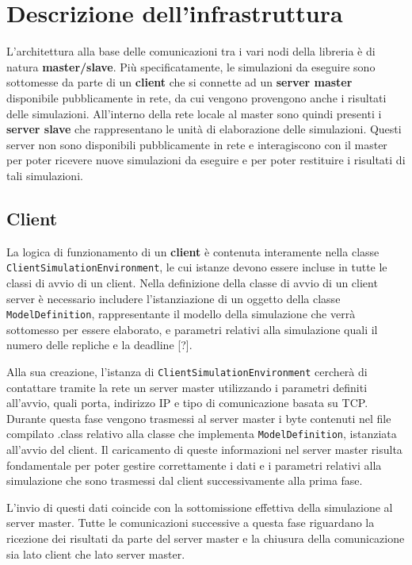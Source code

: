 
\section{Descrizione dell'infrastruttura}
L'architettura alla base delle comunicazioni tra i vari nodi della libreria è di natura \textbf{master/slave}.
Più specificatamente, le simulazioni da eseguire sono sottomesse da parte di un \textbf{client} che si connette ad un \textbf{server master} disponibile pubblicamente in rete, da cui vengono provengono anche i risultati delle simulazioni. 
All'interno della rete locale al master sono quindi presenti i \textbf{server slave} che rappresentano le unità di elaborazione delle simulazioni. Questi server non sono disponibili pubblicamente in rete e interagiscono con il master per poter ricevere nuove simulazioni da eseguire e per poter restituire i risultati di tali simulazioni.

\subsection{Client}
La logica di funzionamento di un \textbf{client} è contenuta interamente nella classe \texttt{ClientSimulationEnvironment}, le cui istanze devono essere incluse in tutte le classi di avvio di un client.
Nella definizione della classe di avvio di un client server è necessario includere l'istanziazione di un oggetto della classe \texttt{ModelDefinition}, rappresentante il modello della simulazione che verrà sottomesso per essere elaborato, e parametri relativi alla simulazione quali il numero delle repliche e la deadline [?].

Alla sua creazione, l'istanza di \texttt{ClientSimulationEnvironment} cercherà di contattare tramite la rete un server master utilizzando i parametri definiti all'avvio, quali porta, indirizzo IP e tipo di comunicazione basata su TCP. 
Durante questa fase vengono trasmessi al server master i byte contenuti nel file compilato .class relativo alla classe che implementa \texttt{ModelDefinition}, istanziata all'avvio del client.
Il caricamento di queste informazioni nel server master risulta fondamentale per poter gestire correttamente i dati e i parametri relativi alla simulazione che sono trasmessi dal client successivamente alla prima fase.

L'invio di questi dati coincide con la sottomissione effettiva della simulazione al server master. 
Tutte le comunicazioni successive a questa fase riguardano la ricezione dei risultati da parte del server master e la chiusura della comunicazione sia lato client che lato server master.

